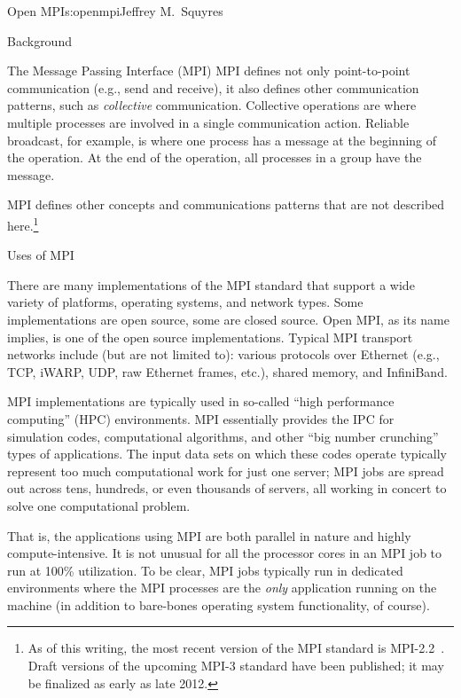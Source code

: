 \begin{aosachapter}{Open MPI}{s:openmpi}{Jeffrey M.\ Squyres}
\begin{aosasect1}{Background}
\begin{aosasect2}{The Message Passing Interface (MPI)}
MPI defines not only point-to-point communication (e.g., send and
receive), it also defines other communication patterns, such as {\em
  collective} communication.  Collective operations are where multiple
processes are involved in a single communication action.  Reliable
broadcast, for example, is where one process has a message at the
beginning of the operation. At the end of the operation, all processes
in a group have the message.

MPI defines other concepts and communications patterns that are not
described here.\footnote{As of this writing, the most recent version
  of the MPI standard is MPI-2.2~\cite{mpi-2.2}.  Draft versions of
  the upcoming MPI-3 standard have been published; it may be finalized
  as early as late 2012.}

\end{aosasect2}


\begin{aosasect2}{Uses of MPI}

There are many implementations of the MPI standard that support a
wide variety of platforms, operating systems, and network types.
Some implementations are open source, some are closed source.  
%
Open MPI, as its name implies, is one of the open source
implementations.
%
Typical MPI transport networks include (but are not limited to):
various protocols over Ethernet (e.g., TCP, iWARP, UDP, raw Ethernet
frames, etc.), shared memory, and InfiniBand.

MPI implementations are typically used in so-called ``high performance
computing'' (HPC) environments.  MPI essentially provides the IPC for
simulation codes, computational algorithms, and other ``big number
crunching'' types of applications.  The input data sets on which these
codes operate typically represent too much computational work for just
one server; MPI jobs are spread out across tens, hundreds, or even
thousands of servers, all working in concert to solve one
computational problem.

That is, the applications using MPI are both parallel in nature and
highly compute-intensive.  It is not unusual for all the processor
cores in an MPI job to run at 100\% utilization.  To be clear, MPI
jobs typically run in dedicated environments where the MPI processes
are the {\em only} application running on the machine (in addition to
bare-bones operating system functionality, of course).


\end{aosasect2}
\end{aosasect1}
\end{aosachapter}
